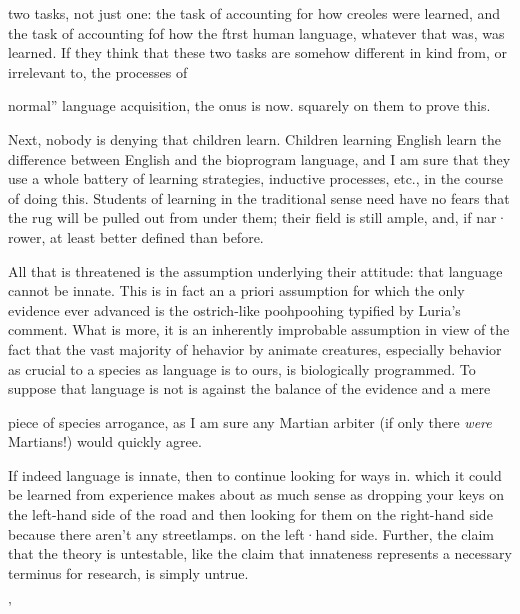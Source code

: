 two tasks, not just one: the task of accounting for how creoles were learned, and the task of accounting fof how the ftrst human language, whatever that was, was learned. If they think that these two tasks are somehow different in kind from, or irrelevant to, the processes of

{\textquotedbl}normal'' language acquisition, the onus is now. squarely on them to prove this.

Next, nobody is denying that children learn. Children learning English learn the difference between English and the bioprogram language, and I am sure that they use a whole battery of learning strategies, inductive processes, etc., in the course of doing this. Students of learning in the traditional sense need have no fears that the rug will be pulled out from under them; their field is still ample, and, if nar· rower, at least better defined than before.

All that is threatened is the assumption underlying their attitude: that language cannot be innate. This is in fact an a priori assumption for which the only evidence ever advanced is the ostrich-like pooh\-poohing typified by Luria's comment. What is more, it is an inherently improbable assumption in view of the fact that the vast majority of hehavior by animate creatures, especially behavior as crucial to a species as language is to ours, is biologically programmed. To suppose that language is not is against the balance of the evidence and a mere

piece of species arrogance, as I am sure any Martian arbiter (if only there \textit{were }Martians!) would quickly agree.

If indeed language is innate, then to continue looking for ways in. which it could be learned from experience makes about as much sense as dropping your keys on the left-hand side of the road and then looking for them on the right-hand side because there aren't any streetlamps. on the left·hand side. Further, the claim that the theory is untestable, like the claim that innateness represents a necessary terminus for research, is simply untrue.

'


